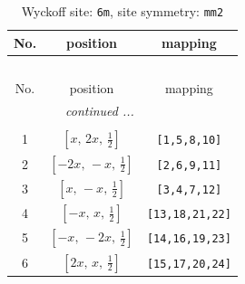 \documentclass[fleqn,8pt]{jsarticle}
\begin{document}
\renewcommand{\arraystretch}{1.2}
\begin{longtable}{ccc}
\caption{Wyckoff site: {\tt 6m}, site symmetry: {\tt mm2}}
 \\
 \hline \hline
No. & position & mapping \\ \hline \endfirsthead

\multicolumn{2}{l}{\tablename\ \thetable{}} \\
 \hline \hline
No. & position & mapping \\ \hline \endhead

 \hline \hline
\multicolumn{2}{r}{\footnotesize\it continued ...} \\ \endfoot

 \hline \hline
\multicolumn{2}{r}{} \\ \endlastfoot

1 & $\left[ x,\, 2 x,\, \frac{1}{2} \right]$ & {\tt [1,5,8,10]} \\ \hline
2 & $\left[ - 2 x,\, - x,\, \frac{1}{2} \right]$ & {\tt [2,6,9,11]} \\ \hline
3 & $\left[ x,\, - x,\, \frac{1}{2} \right]$ & {\tt [3,4,7,12]} \\ \hline
4 & $\left[ - x,\, x,\, \frac{1}{2} \right]$ & {\tt [13,18,21,22]} \\ \hline
5 & $\left[ - x,\, - 2 x,\, \frac{1}{2} \right]$ & {\tt [14,16,19,23]} \\ \hline
6 & $\left[ 2 x,\, x,\, \frac{1}{2} \right]$ & {\tt [15,17,20,24]} \\
\end{longtable}
\renewcommand{\arraystretch}{1.2}
\end{document}
